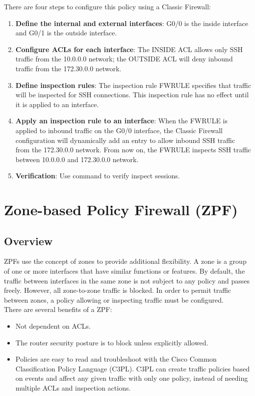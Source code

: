 There are four steps to configure this policy using a Classic Firewall:

\begin{enumerate}
\item \textbf{Define the internal and external interfaces}: G0/0 is the inside interface and G0/1 is the outside interface.
\item \textbf{Configure ACLs for each interface}: The INSIDE ACL allows only SSH traffic from the 10.0.0.0 network; the OUTSIDE ACL will deny inbound traffic from the 172.30.0.0 network.
\item \textbf{Define inspection rules}: The inspection rule FWRULE specifies that traffic will be inspected for SSH connections. This inspection rule has no effect until it is applied to an interface.
\item \textbf{Apply an inspection rule to an interface}: When the FWRULE is applied to inbound traffic on the G0/0 interface, the Classic Firewall configuration will dynamically add an entry to allow inbound SSH traffic from the 172.30.0.0 network. From now on, the FWRULE inspects SSH traffic between 10.0.0.0 and 172.30.0.0 network.
\item \textbf{Verification}: Use  command to verify inspect sessions.
\end{enumerate}

\section{Zone-based Policy Firewall (ZPF)}\label{sec:ZPF}

\subsection{Overview}

ZPFs use the concept of zones to provide additional flexibility. A zone is a group of one or more interfaces that have similar functions or features. By default, the traffic between interfaces in the same zone is not subject to any policy and passes freely. However, all zone-to-zone traffic is blocked. In order to permit traffic between zones, a policy allowing or inspecting traffic must be configured.\\

There are several benefits of a ZPF:

\begin{itemize}
\item Not dependent on ACLs.
\item The router security posture is to block unless explicitly allowed.
\item Policies are easy to read and troubleshoot with the Cisco Common Classification Policy Language (C3PL). C3PL can create traffic policies based on events and affect any given traffic with only one policy, instead of needing multiple ACLs and inspection actions.
\end{itemize}

